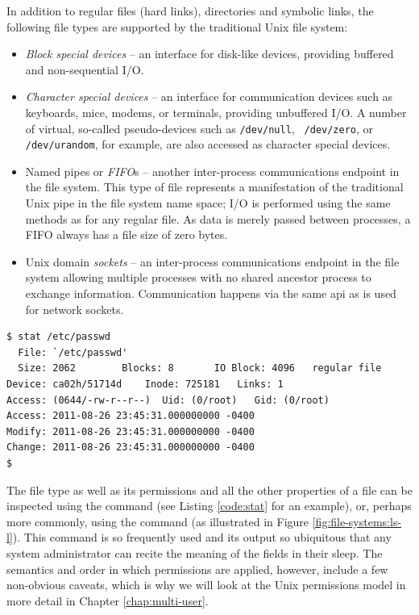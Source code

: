 In addition to regular files (hard links), directories
and symbolic links, the following file types are
supported by the traditional Unix file system:

\begin{itemize}
	\item {\em Block special devices} -- an interface for disk-like
		devices, providing buffered and non-sequential I/O.
	\item {\em Character special devices} -- an interface for
		communication devices such as keyboards, mice, modems, or
		terminals, providing unbuffered I/O.  A number of virtual,
		so-called pseudo-devices such as {\tt /dev/null}, {\tt
		/dev/zero},  or {\tt /dev/urandom}, for
		example, are also accessed as character special devices.
	\item Named pipes or {\em FIFO}s -- another inter-process
		communications endpoint in the file
		system.  This type of file represents a manifestation of
		the traditional Unix pipe in the file system name space;
		I/O is performed using the same methods as for any regular
		file.  As data is merely passed between processes, a FIFO
		always has a file size of zero bytes.
	\item Unix domain {\em sockets} -- an inter-process communications
		endpoint in the file system
		allowing multiple processes with no shared ancestor
		process to exchange information.  Communication happens
		via the same \gls{api} as is used for network sockets.
\end{itemize}

\begin{lstlisting}[float,label=code:stat,caption={[Output of {\tt stat(1)}]Sample
output of the stat(1) command on a Linux system\, showing the various pieces of
information stored in the inode data structure for the file ``/etc/passwd''.}]
$ stat /etc/passwd
  File: `/etc/passwd'
  Size: 2062      	Blocks: 8       IO Block: 4096   regular file
Device: ca02h/51714d	Inode: 725181   Links: 1
Access: (0644/-rw-r--r--)  Uid: (0/root)   Gid: (0/root)
Access: 2011-08-26 23:45:31.000000000 -0400
Modify: 2011-08-26 23:45:31.000000000 -0400
Change: 2011-08-26 23:45:31.000000000 -0400
$
\end{lstlisting}

The file type as well as its permissions and all the
other properties of a file can be inspected using the
 command (see Listing \ref{code:stat}
for an example), or, perhaps more commonly, using the
 command (as illustrated in Figure
\ref{fig:file-systems:ls-l}).  This command is so
frequently used and its output so ubiquitous that any
system administrator can recite the meaning of the
fields in their sleep.  The semantics and order in
which permissions are applied, however, include a few
non-obvious caveats, which is why we will look at the
Unix permissions model in more detail in Chapter
\ref{chap:multi-user}. \\

